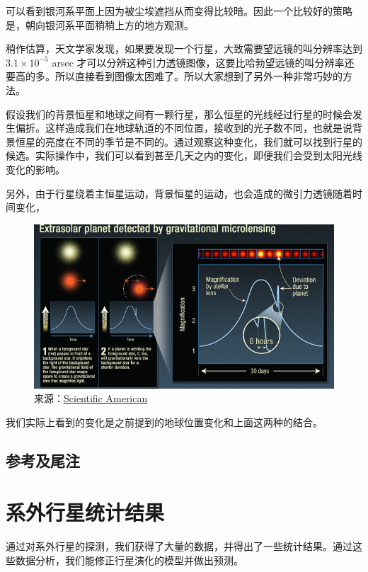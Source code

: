 \documentclass[letterpaper,10pt,english]{sphinxmanual}
\begin{document}
可以看到银河系平面上因为被尘埃遮挡从而变得比较暗。因此一个比较好的策略是，朝向银河系平面稍稍上方的地方观测。

稍作估算，天文学家发现，如果要发现一个行星，大致需要望远镜的叫分辨率达到 \(3.1\times 10^{-5}\) arsec 才可以分辨这种引力透镜图像，这要比哈勃望远镜的叫分辨率还要高的多。所以直接看到图像太困难了。所以大家想到了另外一种非常巧妙的方法。

假设我们的背景恒星和地球之间有一颗行星，那么恒星的光线经过行星的时候会发生偏折。这样造成我们在地球轨道的不同位置，接收到的光子数不同，也就是说背景恒星的亮度在不同的季节是不同的。通过观察这种变化，我们就可以找到行星的候选。实际操作中，我们可以看到甚至几天之内的变化，即便我们会受到太阳光线变化的影响。

另外，由于行星绕着主恒星运动，背景恒星的运动，也会造成的微引力透镜随着时间变化，
\begin{figure}[htbp]
\centering
\capstart

\includegraphics{hs-2012-07-b-web_print.jpg}
\caption{来源：\href{http://blogs.scientificamerican.com/life-unbounded/2012/03/07/gravitational-mesolensing-and-the-hunt-for-exoplanet/}{Scientific American}}\end{figure}

我们实际上看到的变化是之前提到的地球位置变化和上面这两种的结合。


\subsection{参考及尾注}
\label{detection:id14}

\section{系外行星统计结果}
\label{statistics::doc}\label{statistics:id1}
通过对系外行星的探测，我们获得了大量的数据，并得出了一些统计结果。通过这些数据分析，我们能修正行星演化的模型并做出预测。
\end{document}
